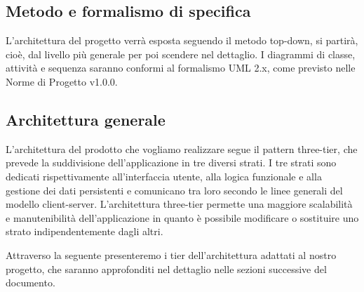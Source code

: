 \subsection{Metodo e formalismo di specifica}
L'architettura del progetto verrà esposta seguendo il metodo top-down, si partirà, cioè, dal livello più generale per poi scendere nel dettaglio. I diagrammi di classe, attività e sequenza saranno conformi al formalismo UML 2.x, come previsto nelle Norme di Progetto v1.0.0.

\subsection{Architettura generale}
L'architettura del prodotto che vogliamo realizzare segue il pattern three-tier, che prevede la suddivisione dell'applicazione in tre diversi strati. I tre strati sono dedicati rispettivamente all'interfaccia utente, alla logica funzionale e alla gestione dei dati persistenti e comunicano tra loro secondo le linee generali del modello client-server. L'architettura three-tier permette una maggiore scalabilità e manutenibilità dell'applicazione in quanto è possibile modificare o sostituire uno strato indipendentemente dagli altri.

Attraverso la seguente presenteremo i tier dell'architettura adattati al nostro progetto, che saranno approfonditi nel dettaglio nelle sezioni successive del documento.

